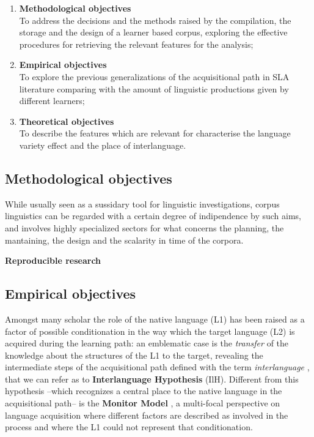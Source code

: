 \documentclass[a4paper,twoside,12pt,chapterprefix=false,bibliography=totocnumbered,listof=flat]{scrbook}
\providecommand{\tightlist}{%
  \setlength{\itemsep}{0pt}\setlength{\parskip}{0pt}}
\theoremstyle{definition}
\theoremstyle{definition}
\theoremstyle{definition}
\theoremstyle{remark}
\begin{document}
\begin{enumerate}
\def\labelenumi{\arabic{enumi}.}
\tightlist
\item
  \textbf{Methodological objectives}\\
  To address the decisions and the methods raised by the compilation,
  the storage and the design of a learner based corpus, exploring the
  effective procedures for retrieving the relevant features for the
  analysis;
\item
  \textbf{Empirical objectives}\\
  To explore the previous generalizations of the acquisitional path in
  SLA literature comparing with the amount of linguistic productions
  given by different learners;
\item
  \textbf{Theoretical objectives}\\
  To describe the features which are relevant for characterise the
  language variety effect and the place of interlanguage.
\end{enumerate}

\subsection{Methodological objectives}\label{methodological-objectives}

While usually seen as a sussidary tool for linguistic investigations,
corpus linguistics can be regarded with a certain degree of indipendence
by such aims, and involves highly specialized sectors for what concerns
the planning, the mantaining, the design and the scalarity in time of
the corpora.

\textbf{Reproducible research}

\subsection{Empirical objectives}\label{empirical-objectives}

Amongst many scholar the role of the native language (L1) has been
raised as a factor of possible conditionation in the way which the
target language (L2) is acquired during the learning path: an emblematic
case is the \emph{transfer} of the knowledge about the structures of the
L1 to the target, revealing the intermediate steps of the acquisitional
path defined with the term \emph{interlanguage} \citep{selinker1972},
that we can refer as to \textbf{Interlanguage Hypothesis} (IlH).
Different from this hypothesis --which recognizes a central place to the
native language in the acquisitional path-- is the \textbf{Monitor
Model} \citep{krashen1981}, a multi-focal perspective on language
acquisition where different factors are described as involved in the
process and where the L1 could not represent that conditionation.
\end{document}
